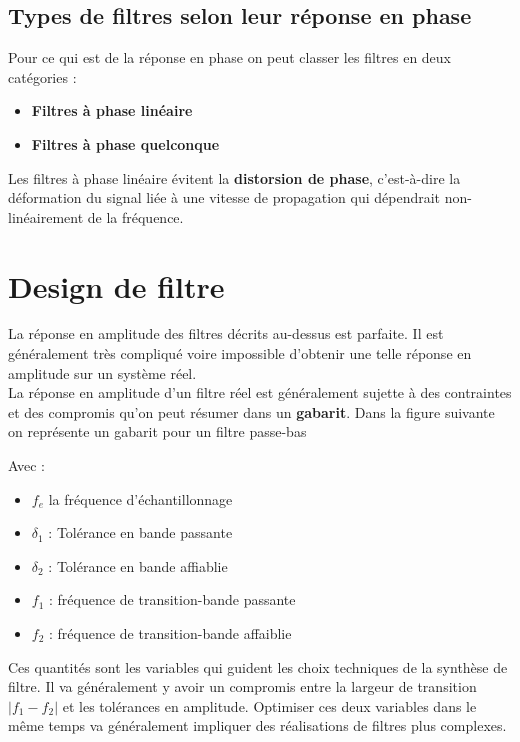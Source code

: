 \documentclass[11pt,a4paper]{article}
\begin{document}
\subsection{Types de filtres selon leur réponse en phase}
Pour ce qui est de la réponse en phase on peut classer les filtres en deux catégories :
\begin{itemize}
\item \textbf{Filtres à phase linéaire}
\item \textbf{Filtres à phase quelconque}
\end{itemize}

Les filtres à phase linéaire évitent la \textbf{distorsion de phase}, c'est-à-dire la déformation du signal liée à une vitesse de propagation qui dépendrait non-linéairement de la fréquence.

\section{Design de filtre}
La réponse en amplitude des filtres décrits au-dessus est parfaite. Il est généralement très compliqué voire impossible d'obtenir une telle réponse en amplitude sur un système réel.\\

La réponse en amplitude d'un filtre réel est généralement sujette à des contraintes et des compromis qu'on peut résumer dans un \textbf{gabarit}. Dans la figure suivante on représente un gabarit pour un filtre passe-bas

\begin{center}
\end{center}
Avec :
\begin{itemize}
\item $f_e$ la fréquence d'échantillonnage
\item $\delta_1$ : Tolérance en bande passante 
\item$\delta_2$ : Tolérance en bande affiablie  
\item$f_1$ : fréquence de transition-bande passante 
\item $f_2$ : fréquence de transition-bande affaiblie 
\end{itemize}
Ces quantités sont les variables qui guident les choix techniques de la synthèse de filtre. Il va généralement y avoir un compromis entre la largeur de transition $|f_1-f_2|$ et les tolérances en amplitude. Optimiser ces deux variables dans le même temps va généralement impliquer des réalisations de filtres plus complexes.\\
\end{document}
